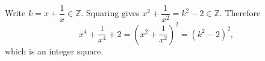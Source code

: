Write $k=x+\dfrac{1}{x}\in\mathbb Z$. Squaring gives $x^2+\dfrac{1}{x^2}=k^2-2\in\mathbb Z$. Therefore
\[x^4+\dfrac{1}{x^4}+2=\left(x^2+\dfrac{1}{x^2}\right)^2=(k^2-2)^2,\]
which is an integer square.
